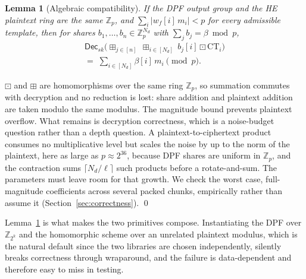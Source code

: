 \documentclass[a4paper,fleqn]{cas-sc}
\newtheorem{lemma}{Lemma}
\newcommand{\Dec}{\mathsf{Dec}}
\newcommand{\bplus}{\boxplus}
\newcommand{\bdot}{\boxdot}
\begin{document}
\begin{lemma}[Algebraic compatibility]
\label{lem:compat}
If the DPF output group and the HE plaintext ring are the same $\mathbb{Z}_p$,
and $\sum_{i}|w_f[i]\,m_i| < p$ for every admissible template, then for shares
$b_1,\dots,b_n\in\mathbb{Z}_p^{N_d}$ with $\sum_j b_j = \beta \bmod p$,
\begin{multline*}
\Dec_{sk}\Big(\bplus_{j\in[n]}\ \bplus_{i\in[N_d]}\ b_j[i]\bdot
\text{CT}_i\Big)\\
=\; \sum_{i\in[N_d]} \beta[i]\,m_i \pmod p .
\end{multline*}
\end{lemma}
\begin{pf}
$\bdot$ and $\bplus$ are homomorphisms over the same ring $\mathbb{Z}_p$, so
summation commutes with decryption and no reduction is lost: share addition
and plaintext addition are taken modulo the same modulus. The magnitude bound
prevents plaintext overflow. What remains is decryption correctness, which is
a noise-budget question rather than a depth question. A
plaintext-to-ciphertext product consumes no multiplicative level but scales
the noise by up to the norm of the plaintext, here as large as
$p\approx2^{36}$, because DPF shares are uniform in $\mathbb{Z}_p$, and the
contraction sums $\lceil N_d/\ell\rceil$ such products before a
rotate-and-sum. The parameters must leave room for that growth. We check the
worst case, full-magnitude coefficients across several packed chunks,
empirically rather than assume it (Section~\ref{sec:correctness}). \qed
\end{pf}

Lemma~\ref{lem:compat} is what makes the two primitives compose. Instantiating
the DPF over $\mathbb{Z}_{2^k}$ and the homomorphic scheme over an unrelated
plaintext modulus, which is the natural default since the two libraries are
chosen independently, silently breaks correctness through wraparound, and the
failure is data-dependent and therefore easy to miss in testing.
\end{document}
